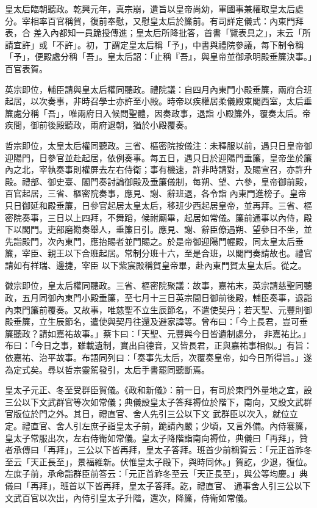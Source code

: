 \begin{pinyinscope}
 皇太后臨朝聽政。乾興元年，真宗崩，遺旨以皇帝尚幼，軍國事兼權取皇太后處分。宰相率百官稱賀，復前奉慰，又慰皇太后於簾前。有司詳定儀式：內東門拜表，合
 差入內都知一員跪授傳進；皇太后所降批答，首書「覽表具之」，末云「所請宜許」或「不許」。初，丁謂定皇太后稱「予」，中書與禮院參議，每下制令稱「予」，便殿處分稱「吾」。皇太后詔：「止稱『吾』，與皇帝並御承明殿垂簾決事。」百官表賀。



 英宗即位，輔臣請與皇太后權同聽政。禮院議：自四月內東門小殿垂簾，兩府合班起居，以次奏事，非時召學士亦許至小殿。時帝以疾權居柔儀殿東閣西室，太后垂簾處分稱「吾」，唯兩府日入候問聖體，因奏政事，退詣
 小殿簾外，覆奏太后。帝疾間，御前後殿聽政，兩府退朝，猶於小殿覆奏。



 哲宗即位，太皇太后權同聽政。三省、樞密院按儀注：未釋服以前，遇只日皇帝御迎陽門，日參官並赴起居，依例奏事。每五日，遇只日於迎陽門垂簾，皇帝坐於簾內之北，宰執奏事則權屏去左右侍衛；事有機速，許非時請對，及賜宣召，亦許升殿。禮部、御史臺、閣門奏討論御殿及垂簾儀制，每朔、望、六參，皇帝御前殿，百官起居，三省、樞密院奏事，應見、謝、辭班退，各令詣
 內東門進榜子。皇帝只日御延和殿垂簾，日參官起居太皇太后，移班少西起居皇帝，並再拜。三省、樞密院奏事，三日以上四拜，不舞蹈，候祔廟畢，起居如常儀。簾前通事以內侍，殿下以閣門。吏部磨勘奏舉人，垂簾日引。應見、謝、辭臣僚遇朔、望參日不坐，並先詣殿門，次內東門，應抬賜者並門賜之。於是帝御迎陽門幄殿，同太皇太后垂簾，宰臣、親王以下合班起居。常制分班十六，至是合班，以閣門奏請故也。禮官請如有祥瑞、邊捷，宰臣
 以下紫宸殿稱賀皇帝畢，赴內東門賀太皇太后。從之。



 徽宗即位，皇太后權同聽政。三省、樞密院聚議：故事，嘉祐末，英宗請慈聖同聽政，五月同御內東門小殿垂簾，至七月十三日英宗間日御前後殿，輔臣奏事，退詣內東門簾前覆奏。又故事，唯慈聖不立生辰節名，不遣使契丹；若天聖、元豐則御殿垂簾，立生辰節名，遣使與契丹往還及避家諱等。曾布曰：「今上長君，豈可垂簾聽政？請如嘉祐故事。」蔡卞曰：「天聖、元豐與今日皆遺制處分，
 非嘉祐比。」布曰：「今日之事，雖載遺制，實出自德音，又皆長君，正與嘉祐事相似。」有旨：依嘉祐、治平故事。布語同列曰：「奏事先太后，次覆奏皇帝，如今日所得旨。」遂為定式矣。尋以哲宗靈駕發引，太后手書罷同聽斷焉。



 皇太子元正、冬至受群臣賀儀。《政和新儀》：前一日，有司於東門外量地之宜，設三公以下文武群官等次如常儀；典儀設皇太子答拜褥位於階下，南向，又設文武群官版位於門之外。其日，禮直官、舍人先引三公以下文
 武群臣以次入，就位立定。禮直官、舍人引左庶子詣皇太子前，跪請內嚴；少頃，又言外備。內侍褰簾，皇太子常服出次，左右侍衛如常儀。皇太子降階詣南向褥位，典儀曰「再拜」，贊者承傳曰「再拜」，三公以下皆再拜，皇太子答拜。班首少前稱賀云：「元正首祚冬至云「天正長至」，景福維新。伏惟皇太子殿下，與時同休。」賀訖，少退，復位。左庶子前，承命詣群臣前答云：「元正首祚冬至云「天正長至」，與公等均慶。」典儀曰「再拜」，班首以下皆再拜，皇太子答拜。訖，禮直官、
 通事舍人引三公以下文武百官以次出，內侍引皇太子升階，還次，降簾，侍衛如常儀。




\end{pinyinscope}
